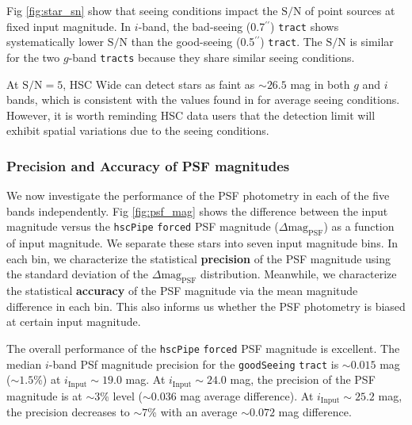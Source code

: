 \documentclass[useamsfonts]{pasj01}
\def\asec{$^{\prime\prime}$}
\def\hscpipe{\texttt{hscPipe}}
\def\forced{\texttt{forced}}
\def\tract{\texttt{tract}}
\def\tracts{\texttt{tracts}}
\def\s2n{{$\mathrm{S}/\mathrm{N}$}}
\begin{document}
    Fig \ref{fig:star_sn} show that seeing conditions impact the \s2n{} of point
    sources at fixed input magnitude.
    In $i$-band, the bad-seeing (0.7\asec{}) \tract{} shows systematically
    lower \s2n{} than the good-seeing (0.5\asec{}) \tract{}.
    The \s2n{} is similar for the two $g$-band \tracts{} because they share similar 
    seeing conditions. 

    At \s2n{}$=5$, HSC Wide can detect stars as faint as ${\sim}26.5$ mag in both $g$ 
    and $i$ bands, which is consistent with the values found in \citet{HSCDR1} for 
    average seeing conditions.
    However, it is worth reminding HSC data users that the detection
    limit will exhibit spatial variations due to the seeing conditions.

\subsubsection{Precision and Accuracy of PSF magnitudes}

    We now investigate the performance of the PSF photometry in each of the five bands
    independently. 
    Fig \ref{fig:psf_mag} shows the difference between the input magnitude versus the
    \hscpipe{} \forced{} PSF magnitude ($\Delta \mathrm{mag}_{\mathrm{PSF}}$) as a 
    function of input magnitude. 
    We separate these stars into seven input magnitude bins.  
    In each bin, we characterize the statistical \textbf{precision} of the PSF 
    magnitude using the standard deviation of the $\Delta \mathrm{mag}_{\mathrm{PSF}}$ 
    distribution.
    Meanwhile, we characterize the statistical \textbf{accuracy} of the PSF magnitude 
    via the mean magnitude difference in each bin. 
    This also informs us whether the PSF photometry is biased at certain input 
    magnitude.
    
    The overall performance of the \hscpipe{} \forced{} PSF magnitude is excellent. 
    The median $i$-band PSf magnitude precision for the \texttt{goodSeeing} \tract{} 
    is ${\sim}0.015$ mag (${\sim}1.5$\%) at $i_{\mathrm{Input}}{\sim}19.0$ mag. 
    At $i_{\mathrm{Input}}{\sim}24.0$ mag, the precision of the PSF magnitude is 
    at ${\sim}3$\% level (${\sim}0.036$ mag average difference).
    At $i_{\mathrm{Input}}{\sim}25.2$ mag, the precision decreases to
    ${\sim}7$\% with an average ${\sim}0.072$ mag difference.
    
\end{document}
